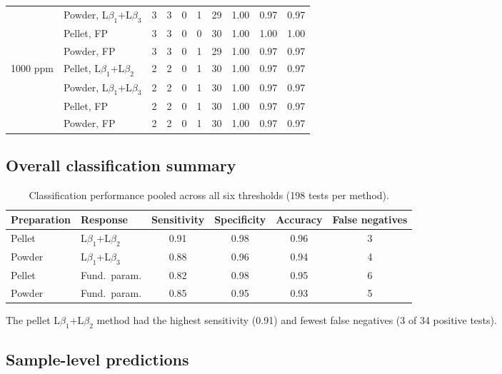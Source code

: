 \documentclass[journal=esthag,manuscript=suppinfo]{achemso}
\begin{document}
\begin{table}[htbp]
\begin{tabular}{l l c c c c c c c c}
  & Powder, L$\beta_1$+L$\beta_3$ & 3 & 3 & 0 & 1 & 29 & 1.00 & 0.97 & 0.97 \\
  & Pellet, FP                    & 3 & 3 & 0 & 0 & 30 & 1.00 & 1.00 & 1.00 \\
  & Powder, FP                    & 3 & 3 & 0 & 1 & 29 & 1.00 & 0.97 & 0.97 \\
\midrule
\multirow{4}{*}{1000 ppm}
  & Pellet, L$\beta_1$+L$\beta_2$ & 2 & 2 & 0 & 1 & 30 & 1.00 & 0.97 & 0.97 \\
  & Powder, L$\beta_1$+L$\beta_3$ & 2 & 2 & 0 & 1 & 30 & 1.00 & 0.97 & 0.97 \\
  & Pellet, FP                    & 2 & 2 & 0 & 1 & 30 & 1.00 & 0.97 & 0.97 \\
  & Powder, FP                    & 2 & 2 & 0 & 1 & 30 & 1.00 & 0.97 & 0.97 \\
\bottomrule
\end{tabular}
\end{table}

\subsection*{Overall classification summary}

\begin{table}[htbp]
\caption{Classification performance pooled across all six thresholds (198 tests per method).}
\label{tab:s5_method_summary}
\centering
\small
\begin{tabular}{l l c c c c}
\toprule
Preparation & Response & Sensitivity & Specificity & Accuracy & False negatives \\
\midrule
Pellet  & L$\beta_1$+L$\beta_2$ & 0.91 & 0.98 & 0.96 & 3 \\
Powder  & L$\beta_1$+L$\beta_3$ & 0.88 & 0.96 & 0.94 & 4 \\
Pellet  & Fund.\ param.         & 0.82 & 0.98 & 0.95 & 6 \\
Powder  & Fund.\ param.         & 0.85 & 0.95 & 0.93 & 5 \\
\bottomrule
\end{tabular}
\end{table}

The pellet L$\beta_1$+L$\beta_2$ method had the highest sensitivity (0.91) and fewest false negatives (3 of 34 positive tests).

\subsection*{Sample-level predictions}
\end{document}

